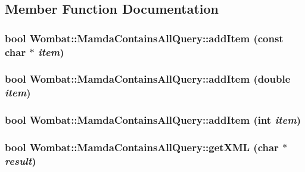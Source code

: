 \subsection{Member Function Documentation}
\hypertarget{classWombat_1_1MamdaContainsAllQuery_aa2c137302b6ee1bc13568ce3dd69d0e}{
\subsubsection[addItem]{\setlength{\rightskip}{0pt plus 5cm}bool Wombat::Mamda\-Contains\-All\-Query::add\-Item (const char $\ast$ {\em item})}}
\label{classWombat_1_1MamdaContainsAllQuery_aa2c137302b6ee1bc13568ce3dd69d0e}


\hypertarget{classWombat_1_1MamdaContainsAllQuery_59c1a8a697f61215b0f6644d309e1a58}{
\subsubsection[addItem]{\setlength{\rightskip}{0pt plus 5cm}bool Wombat::Mamda\-Contains\-All\-Query::add\-Item (double {\em item})}}
\label{classWombat_1_1MamdaContainsAllQuery_59c1a8a697f61215b0f6644d309e1a58}


\hypertarget{classWombat_1_1MamdaContainsAllQuery_ed4ddaf3ac9630af31be7daa74bb4885}{
\subsubsection[addItem]{\setlength{\rightskip}{0pt plus 5cm}bool Wombat::Mamda\-Contains\-All\-Query::add\-Item (int {\em item})}}
\label{classWombat_1_1MamdaContainsAllQuery_ed4ddaf3ac9630af31be7daa74bb4885}


\hypertarget{classWombat_1_1MamdaContainsAllQuery_b904ded6460672fe834c0f704576d50c}{
\subsubsection[getXML]{\setlength{\rightskip}{0pt plus 5cm}bool Wombat::Mamda\-Contains\-All\-Query::get\-XML (char $\ast$ {\em result})}}
\label{classWombat_1_1MamdaContainsAllQuery_b904ded6460672fe834c0f704576d50c}




